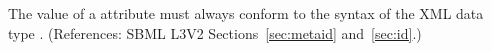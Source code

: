 The value of a  attribute must always conform to the syntax
of the XML data type .  (References: SBML L3V2
Sections~\ref{sec:metaid} and~\ref{sec:id}.)
